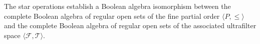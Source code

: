 The star operations establish a Boolean algebra isomorphism between the complete Boolean algebra of regular open sets of the fine partial order $\langle P, \leq \rangle$ and the complete Boolean algebra of regular open sets of the associated ultrafilter space $\langle \mathcal{F}, \mathcal{T} \rangle$.
